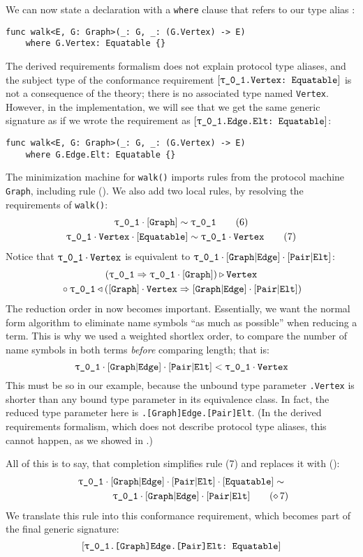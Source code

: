 \documentclass[../generics]{subfiles}
\begin{document}
\begin{example}
We can now state a declaration with a \texttt{where} clause that refers to our type alias \nV:
\begin{Verbatim}
func walk<E, G: Graph>(_: G, _: (G.Vertex) -> E)
    where G.Vertex: Equatable {}
\end{Verbatim}
The derived requirements formalism does not explain protocol type aliases, and the subject type of the conformance requirement $\ConfReq{\rU.Vertex}{Equatable}$ is not a consequence of the theory; there is no associated type named \texttt{Vertex}. However, in the implementation, we will see that we get the same generic signature as if we wrote the requirement as $\ConfReq{\rU.Edge.Elt}{Equatable}$:
\begin{Verbatim}
func walk<E, G: Graph>(_: G, _: (G.Vertex) -> E)
    where G.Edge.Elt: Equatable {}
\end{Verbatim}

The minimization machine for \texttt{walk()} imports rules from the protocol machine \texttt{Graph}, including rule (). We also add two local rules, by resolving the requirements of \texttt{walk()}:
\begin{gather*}
\ConfRule{\rU}{\pGraph}\tag{6}\\
\ConfRule{\rU\cdot\nV}{\pEquatable}\tag{7}
\end{gather*}
Notice that $\rU\cdot\nV$ is equivalent to $\rU\cdot\aEd\cdot\aEl$:
\begin{gather*}
(\rU \Rightarrow \rU\cdot\pGraph) \WR \nV \\
{} \circ \rU \WL (\pGraph \cdot \nV \Rightarrow \aEd\cdot\aEl)
\end{gather*}
The reduction order in  now becomes important. Essentially, we want the normal form algorithm to eliminate name symbols ``as much as possible'' when reducing a term. This is why we used a weighted shortlex order, to compare the number of name symbols in both terms \emph{before} comparing length; that is:
\[\rU\cdot\aEd\cdot\aEl < \rU\cdot\nV\]
This must be so in our example, because the unbound type parameter \texttt{\rU.Vertex} is shorter than any bound type parameter in its equivalence class. In fact, the reduced type parameter here is \texttt{\rU.[Graph]Edge.[Pair]Elt}. (In the derived requirements formalism, which does not describe protocol type aliases, this cannot happen, as we showed in .)

All of this is to say, that completion simplifies rule (7) and replaces it with ():
\begin{gather*}
\rU\cdot\aEd\cdot\aEl\cdot\pEquatable \sim\\
\qquad\qquad \rU\cdot\aEd\cdot\aEl
\tag{\CRule{7}}
\end{gather*}
We translate this rule into this conformance requirement, which becomes part of the final generic signature:
\[\ConfReq{\rU.[Graph]Edge.[Pair]Elt}{Equatable}\]
\end{example}
\end{document}
